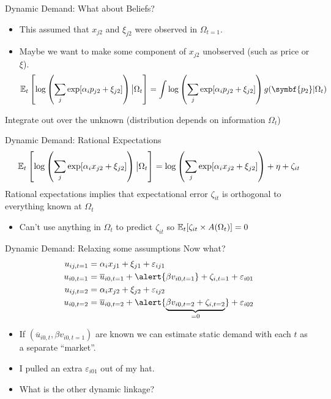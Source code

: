 \begin{frame}{Dynamic Demand: What about Beliefs?}
\begin{itemize}
\item This assumed that $x_{j2}$ and $\xi_{j2}$ were observed in $\Omega_{t=1}$.
\item Maybe we want to make some component of $x_{j2}$ \alert{unobserved} (such as price or $\xi$).
$$
\E_t\left[ \log \left( \sum_j \exp [ \alpha_i p_{j2}  +  \xi_{j2} ] \right)\big| \Omega_t\right]= 
\int \log \left( \sum_j \exp [ \alpha_i p_{j2}  +  \xi_{j2} ] \right)  g(\symbf{p_2} | \Omega_t) 
$$
\end{itemize}
Integrate out over the unknown (distribution depends on information $\Omega_t$)
\end{frame}

\begin{frame}{Dynamic Demand: Rational Expectations}
$$
\mathbb{E}_t\left[ \log \left( \sum_j \exp [ \alpha_i x_{j2}  +  \xi_{j2} ] \right)\big| \Omega_t\right]= 
\log \left( \sum_j \exp [ \alpha_i x_{j2}  +  \xi_{j2} ] \right)  + \eta+  \zeta_{it}
$$
Rational expectations implies that expectational error $\zeta_{it}$ is orthogonal to everything known at $\Omega_t$
\begin{itemize}
\item Can't use anything in $\Omega_t$ to predict $\zeta_{it}$ so $\mathbb{E}_t[\zeta_{it} \times A(\Omega_t)]=0$
\end{itemize}
\end{frame}

\begin{frame}{Dynamic Demand: Relaxing some assumptions}
Now what?
\begin{align*}
u_{ij,t=1} &=   \alpha_i x_{j1}  +  \xi_{j1} + \varepsilon_{ij1}\\
u_{i0,t=1} &=  \overline{u}_{i0,t=1}+  \alert{\beta v_{i0,t=1}} + \zeta_{i,t=1}+ \varepsilon_{i01} \\
u_{ij,t=2} &=   \alpha_i x_{j2}  +  \xi_{j2} + \varepsilon_{ij2}\\
u_{i0,t=2} &= \overline{u}_{i0,t=2} +  \alert{\underbrace{\beta v_{i0,t=2}+ \zeta_{i,t=2} }_{=0}}+\varepsilon_{i02} 
\end{align*}
\vspace{-.5cm}
\begin{itemize}
\item If $(\overline{u}_{i0,t}, \beta v_{i0,t=1})$ are known we can estimate static demand with each $t$ as a separate ``market''.
\item I pulled an extra $\varepsilon_{i01}$ out of my hat.
\item What is the other dynamic linkage?
\end{itemize}
\end{frame}


